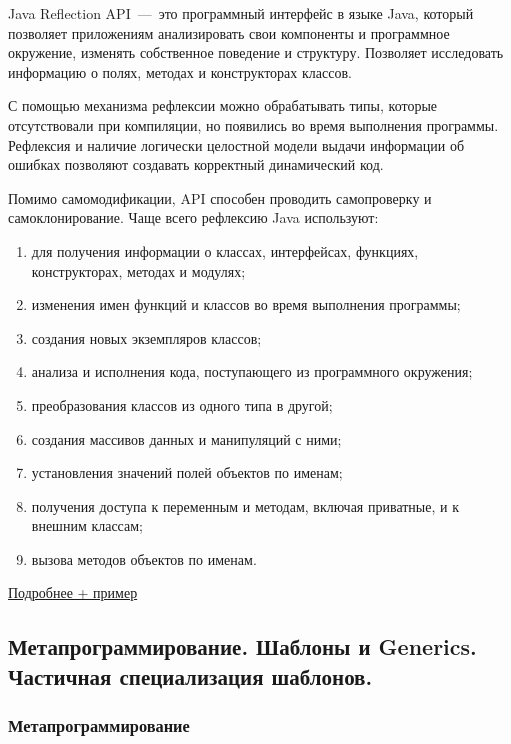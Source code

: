 \documentclass{article}
\begin{document}
Java Reflection API~---~это программный интерфейс в языке Java, который позволяет приложениям анализировать свои компоненты и программное окружение, изменять собственное поведение и структуру. Позволяет исследовать информацию о полях, методах и конструкторах классов.

С помощью механизма рефлексии можно обрабатывать типы, которые отсутствовали при компиляции, но появились во время выполнения программы. Рефлексия и наличие логически целостной модели выдачи информации об ошибках позволяют создавать корректный динамический код. 

Помимо самомодификации, API способен проводить самопроверку и самоклонирование. Чаще всего рефлексию Java используют:
\begin{enumerate}
	\item для получения информации о классах, интерфейсах, функциях, конструкторах, методах и модулях;
	\item изменения имен функций и классов во время выполнения программы;
	\item создания новых экземпляров классов;
	\item анализа и исполнения кода, поступающего из программного окружения;
	\item преобразования классов из одного типа в другой;
	\item создания массивов данных и манипуляций с ними;
	\item установления значений полей объектов по именам;
	\item получения доступа к переменным и методам, включая приватные, и к внешним классам;
	\item вызова методов объектов по именам.
\end{enumerate}
\href{https://blog.skillfactory.ru/glossary/java-reflection-api/#:~:text=Java%20Reflection%20API%20%E2%80%94%20%D1%8D%D1%82%D0%BE%20%D0%BF%D1%80%D0%BE%D0%B3%D1%80%D0%B0%D0%BC%D0%BC%D0%BD%D1%8B%D0%B9,%D0%BF%D0%BE%D0%BB%D1%8F%D1%85%2C%20%D0%BC%D0%B5%D1%82%D0%BE%D0%B4%D0%B0%D1%85%20%D0%B8%20%D0%BA%D0%BE%D0%BD%D1%81%D1%82%D1%80%D1%83%D0%BA%D1%82%D0%BE%D1%80%D0%B0%D1%85%20%D0%BA%D0%BB%D0%B0%D1%81%D1%81%D0%BE%D0%B2.}{Подробнее + пример}
\subsection{Метапрограммирование. Шаблоны и Generics. Частичная специализация шаблонов.}

\subsubsection{Метапрограммирование}
\end{document}
